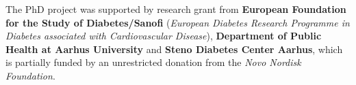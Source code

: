 \documentclass[
  a4paper,
  headsepline=true,
  open=left]{scrbook}
\begin{document}

The PhD project was supported by research grant from \textbf{European
Foundation for the Study of Diabetes/Sanofi} (\emph{European Diabetes
Research Programme in Diabetes associated with Cardiovascular Disease}),
\textbf{Department of Public Health at Aarhus University} and
\textbf{Steno Diabetes Center Aarhus}, which is partially funded by an
unrestricted donation from the \emph{Novo Nordisk Foundation}.

\begin{figure}

\begin{minipage}[t]{0.33\linewidth}

{\centering 


}

\end{minipage}%
%
\begin{minipage}[t]{0.33\linewidth}

{\centering 


}

\end{minipage}%
%
\begin{minipage}[t]{0.33\linewidth}

{\centering 

}
\end{minipage}
\end{figure}
\end{document}
